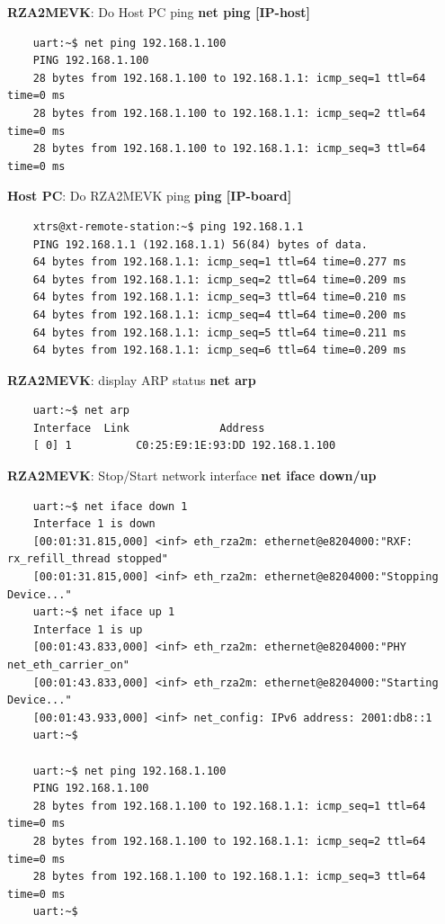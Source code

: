 \documentclass[11pt,a4paper,oneside]{article}
\begin{document}
\textbf{RZA2MEVK}: Do Host PC ping \textbf{net ping [IP-host]}
\begin{lstlisting}
	uart:~$ net ping 192.168.1.100
	PING 192.168.1.100
	28 bytes from 192.168.1.100 to 192.168.1.1: icmp_seq=1 ttl=64 time=0 ms
	28 bytes from 192.168.1.100 to 192.168.1.1: icmp_seq=2 ttl=64 time=0 ms
	28 bytes from 192.168.1.100 to 192.168.1.1: icmp_seq=3 ttl=64 time=0 ms
\end{lstlisting}

\textbf{Host PC}: Do RZA2MEVK ping \textbf{ping [IP-board]}
\begin{lstlisting}
	xtrs@xt-remote-station:~$ ping 192.168.1.1
	PING 192.168.1.1 (192.168.1.1) 56(84) bytes of data.
	64 bytes from 192.168.1.1: icmp_seq=1 ttl=64 time=0.277 ms
	64 bytes from 192.168.1.1: icmp_seq=2 ttl=64 time=0.209 ms
	64 bytes from 192.168.1.1: icmp_seq=3 ttl=64 time=0.210 ms
	64 bytes from 192.168.1.1: icmp_seq=4 ttl=64 time=0.200 ms
	64 bytes from 192.168.1.1: icmp_seq=5 ttl=64 time=0.211 ms
	64 bytes from 192.168.1.1: icmp_seq=6 ttl=64 time=0.209 ms
\end{lstlisting}

\textbf{RZA2MEVK}: display ARP status \textbf{net arp}
\begin{lstlisting}
	uart:~$ net arp
	Interface  Link              Address
	[ 0] 1          C0:25:E9:1E:93:DD 192.168.1.100
\end{lstlisting}

\textbf{RZA2MEVK}: Stop/Start network interface \textbf{net iface down/up}
\begin{lstlisting}
	uart:~$ net iface down 1
	Interface 1 is down
	[00:01:31.815,000] <inf> eth_rza2m: ethernet@e8204000:"RXF: rx_refill_thread stopped"
	[00:01:31.815,000] <inf> eth_rza2m: ethernet@e8204000:"Stopping Device..."
	uart:~$ net iface up 1
	Interface 1 is up
	[00:01:43.833,000] <inf> eth_rza2m: ethernet@e8204000:"PHY net_eth_carrier_on"
	[00:01:43.833,000] <inf> eth_rza2m: ethernet@e8204000:"Starting Device..."
	[00:01:43.933,000] <inf> net_config: IPv6 address: 2001:db8::1
	uart:~$

	uart:~$ net ping 192.168.1.100
	PING 192.168.1.100
	28 bytes from 192.168.1.100 to 192.168.1.1: icmp_seq=1 ttl=64 time=0 ms
	28 bytes from 192.168.1.100 to 192.168.1.1: icmp_seq=2 ttl=64 time=0 ms
	28 bytes from 192.168.1.100 to 192.168.1.1: icmp_seq=3 ttl=64 time=0 ms
	uart:~$
\end{lstlisting}
\end{document}
